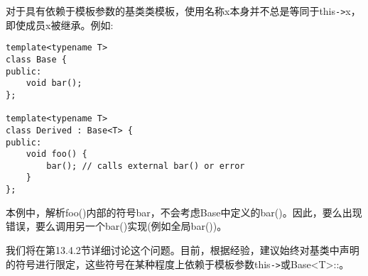 对于具有依赖于模板参数的基类类模板，使用名称x本身并不总是等同于this\texttt{->}x，即使成员x被继承。例如:

\begin{lstlisting}[style=styleCXX]
template<typename T>
class Base {
public:
	void bar();
};

template<typename T>
class Derived : Base<T> {
public:
	void foo() {
		bar(); // calls external bar() or error
	}
};
\end{lstlisting}

本例中，解析foo()内部的符号bar，不会考虑Base中定义的bar()。因此，要么出现错误，要么调用另一个bar()实现(例如全局bar())。

我们将在第13.4.2节详细讨论这个问题。目前，根据经验，建议始终对基类中声明的符号进行限定，这些符号在某种程度上依赖于模板参数this\texttt{->}或Base<T>::。














































